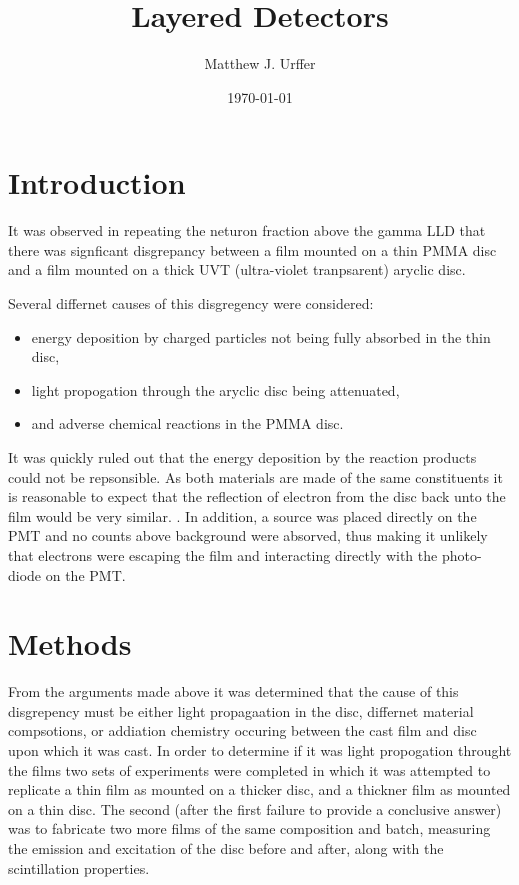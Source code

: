 \documentclass[draftcls,onecolumn]{IEEEtran}
\begin{document}
\title{Layered Detectors}
\author{Matthew J. Urffer}
\date{\today}
\maketitle


\listoftodos
\tableofcontents
\listoffigures
\listoftables
\lstlistoflistings
\section{Introduction}
It was observed in repeating the neturon fraction above the gamma LLD that there was signficant disgrepancy between a film mounted on a thin PMMA disc and a film mounted on a thick UVT (ultra-violet tranpsarent) aryclic disc.

Several differnet causes of this disgregency were considered:
\begin{itemize}
  \item energy deposition by charged particles not being fully absorbed in the thin disc,
  \item light propogation through the aryclic disc being attenuated,
  \item and adverse chemical reactions in the PMMA disc.
\end{itemize}

It was quickly ruled out that the energy deposition by the reaction products could not be repsonsible.
As both materials are made of the same constituents it is reasonable to expect that the reflection of electron from the disc back unto the film would be very similar.
.
In addition, a  source was placed directly on the PMT and no counts above background were absorved, thus making it unlikely that electrons were escaping the film and interacting directly with the photo-diode on the PMT.

\section{Methods}
From the arguments made above it was determined that the cause of this disgrepency must be either light propagaation in the disc, differnet material compsotions, or addiation chemistry occuring between the cast film and disc upon which it was cast.
In order to determine if it was light propogation throught the films two sets of experiments were completed in which it was attempted to replicate a thin film as mounted on a thicker disc, and a thickner film as mounted on a thin disc.
The second (after the first failure to provide a conclusive answer) was to fabricate two more films of the same composition and batch, measuring the emission and excitation of the disc before and after, along with the scintillation properties.
\end{document}
